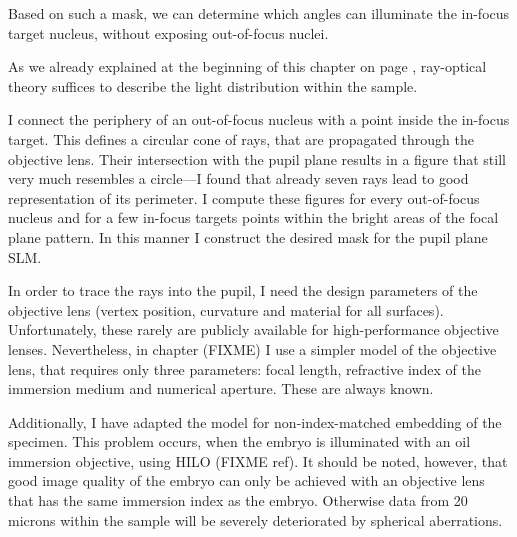 Based on such a mask, we can determine which angles can illuminate the
in-focus target nucleus, without exposing out-of-focus nuclei.

As we already explained at the beginning of this chapter on page
\pageref{sec:ray-valid}, ray-optical theory suffices to describe the
light distribution within the sample.

I connect the periphery of an out-of-focus nucleus with a point inside
the in-focus target. This defines a circular cone of rays, that are
propagated through the objective lens. Their intersection with the
pupil plane results in a figure that still very much resembles a
circle---I found that already seven rays lead to good representation
of its perimeter.  I compute these figures for every out-of-focus
nucleus and for a few in-focus targets points within the bright areas
of the focal plane pattern. In this manner I construct the desired
mask for the pupil plane SLM.

In order to trace the rays into the pupil, I need the design
parameters of the objective lens (vertex position, curvature and
material for all surfaces). Unfortunately, these rarely are publicly
available for high-performance objective lenses. Nevertheless, in
chapter (FIXME) I use a simpler model of the objective lens, that
requires only three parameters: focal length, refractive index of the
immersion medium and numerical aperture. These are always known.

Additionally, I have adapted the model for non-index-matched embedding
of the specimen. This problem occurs, when the embryo is illuminated
with an oil immersion objective, using HILO (FIXME ref). It should be
noted, however, that good image quality of the embryo can only be
achieved with an objective lens that has the same immersion index as
the embryo. Otherwise data from 20 microns within the sample will be
severely deteriorated by spherical aberrations.
